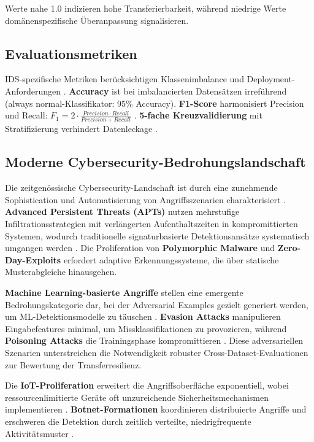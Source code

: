 \documentclass[11pt,a4paper]{article}
\begin{document}
    Werte nahe 1.0 indizieren hohe Transferierbarkeit, während niedrige Werte domänenspezifische Überanpassung signalisieren.

    \subsection{Evaluationsmetriken}

    IDS-spezifische Metriken berücksichtigen Klassenimbalance und Deployment-Anforderungen \parencite{Belavagi2016}. \textbf{Accuracy} ist bei imbalancierten Datensätzen irreführend (always normal-Klassifikator: 95\% Accuracy). \textbf{F1-Score} harmonisiert Precision und Recall: $F_1 = 2 \cdot \frac{Precision \cdot Recall}{Precision + Recall}$ \parencite{Hastie2009,Mourouzis2021}. \textbf{5-fache Kreuzvalidierung} mit Stratifizierung verhindert Datenleckage \parencite{Tavallaee2009}.

    \subsection{Moderne Cybersecurity-Bedrohungslandschaft}

    Die zeitgenössische Cybersecurity-Landschaft ist durch eine zunehmende Sophistication und Automatisierung von Angriffsszenarien charakterisiert \parencite{GlobalRisksReport2024}. \textbf{Advanced Persistent Threats (APTs)} nutzen mehrstufige Infiltrationsstrategien mit verlängerten Aufenthaltszeiten in kompromittierten Systemen, wodurch traditionelle signaturbasierte Detektionsansätze systematisch umgangen werden \parencite{Ring2019}. Die Proliferation von \textbf{Polymorphic Malware} und \textbf{Zero-Day-Exploits} erfordert adaptive Erkennungssysteme, die über statische Musterabgleiche hinausgehen.

    \textbf{Machine Learning-basierte Angriffe} stellen eine emergente Bedrohungskategorie dar, bei der Adversarial Examples gezielt generiert werden, um ML-Detektionsmodelle zu täuschen \parencite{Goodfellow2016}. \textbf{Evasion Attacks} manipulieren Eingabefeatures minimal, um Missklassifikationen zu provozieren, während \textbf{Poisoning Attacks} die Trainingsphase kompromittieren \parencite{Bishop2006}. Diese adversariellen Szenarien unterstreichen die Notwendigkeit robuster Cross-Dataset-Evaluationen zur Bewertung der Transferresilienz.

    Die \textbf{IoT-Proliferation} erweitert die Angriffsoberfläche exponentiell, wobei ressourcenlimitierte Geräte oft unzureichende Sicherheitsmechanismen implementieren \parencite{Vinayakumar2019}. \textbf{Botnet-Formationen} koordinieren distribuierte Angriffe und erschweren die Detektion durch zeitlich verteilte, niedrigfrequente Aktivitätsmuster \parencite{Sharafaldin2018}.
\end{document}
